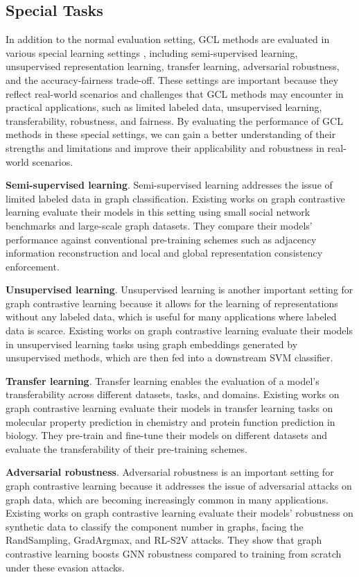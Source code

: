 \documentclass[11pt]{article}
\begin{document}
\subsection{Special Tasks}
In addition to the normal evaluation setting, GCL methods are evaluated in various special learning settings \cite{you2020graph, you2021graph, you2022bringing, wei2022augmentations, kose2022fair, kose2022fair2, ling2023learning, xie2022task}, including semi-supervised learning, unsupervised representation learning, transfer learning, adversarial robustness, and the accuracy-fairness trade-off. These settings are important because they reflect real-world scenarios and challenges that GCL methods may encounter in practical applications, such as limited labeled data, unsupervised learning, transferability, robustness, and fairness. By evaluating the performance of GCL methods in these special settings, we can gain a better understanding of their strengths and limitations and improve their applicability and robustness in real-world scenarios.

\textbf{Semi-supervised learning}. Semi-supervised learning addresses the issue of limited labeled data in graph classification. Existing works on graph contrastive learning evaluate their models in this setting using small social network benchmarks and large-scale graph datasets. They compare their models' performance against conventional pre-training schemes such as adjacency information reconstruction and local and global representation consistency enforcement.

\textbf{Unsupervised learning}. Unsupervised learning is another important setting for graph contrastive learning because it allows for the learning of representations without any labeled data, which is useful for many applications where labeled data is scarce. Existing works on graph contrastive learning evaluate their models in unsupervised learning tasks using graph embeddings generated by unsupervised methods, which are then fed into a downstream SVM classifier.

\textbf{Transfer learning}. Transfer learning enables the evaluation of a model's transferability across different datasets, tasks, and domains. Existing works on graph contrastive learning evaluate their models in transfer learning tasks on molecular property prediction in chemistry and protein function prediction in biology. They pre-train and fine-tune their models on different datasets and evaluate the transferability of their pre-training schemes.

\textbf{Adversarial robustness}. Adversarial robustness is an important setting for graph contrastive learning because it addresses the issue of adversarial attacks on graph data, which are becoming increasingly common in many applications. Existing works on graph contrastive learning evaluate their models' robustness on synthetic data to classify the component number in graphs, facing the RandSampling, GradArgmax, and RL-S2V attacks. They show that graph contrastive learning boosts GNN robustness compared to training from scratch under these evasion attacks.
\end{document}
